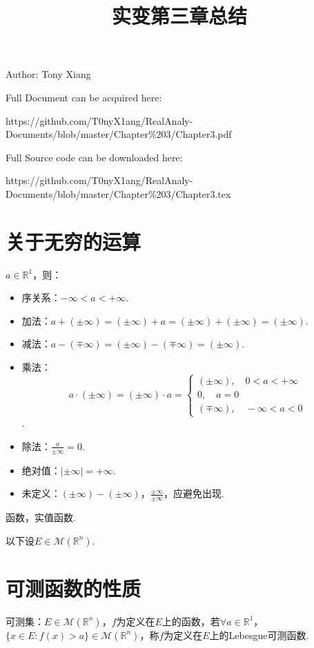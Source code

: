 \documentclass[bwprint, withoutpreface]{cumcmthesis}
\title{实变第三章总结}
\begin{document}
\maketitle
\noindent Author: Tony Xiang

\noindent Full Document can be acquired here: 

\noindent https://github.com/T0nyX1ang/RealAnaly-Documents/blob/master/Chapter\%203/Chapter3.pdf

\noindent Full Source code can be downloaded here:

\noindent https://github.com/T0nyX1ang/RealAnaly-Documents/blob/master/Chapter\%203/Chapter3.tex

\section{关于无穷的运算}
\indent $a \in \mathbb{R}^1$，则：
\begin{itemize}[itemindent=2em]
	\item 序关系：$-\infty < a < +\infty$.
	\item 加法：$a + (\pm{\infty}) = (\pm{\infty}) + a = (\pm{\infty}) + (\pm{\infty}) = (\pm{\infty})$.
	\item 减法：$a - (\mp{\infty}) = (\pm{\infty}) - (\mp{\infty}) = (\pm{\infty})$.
	\item 乘法：
	\begin{equation*}
	a \cdot (\pm{\infty}) = (\pm{\infty}) \cdot a = 
	\begin{cases}
		(\pm{\infty}), \quad 0 < a < +\infty \\
		0, \quad a = 0 \\
		(\mp{\infty}), \quad -\infty < a < 0
	\end{cases} 
	\end{equation*}.
	\item 除法：$\frac{a}{\pm{\infty}} = 0$.
	\item 绝对值：$|\pm{\infty}| = +\infty$.
	\item 未定义：$(\pm{\infty}) - (\pm{\infty})$，$\frac{\pm{\infty}}{\pm{\infty}}$，应避免出现.
\end{itemize}

函数，实值函数.

以下设$E \in \mathcal{M}(\mathbb{R}^n)$.

\section{可测函数的性质}
\indent 可测集：$E \in \mathcal{M}(\mathbb{R}^n)$，$f$为定义在$E$上的函数，若$\forall a \in \mathbb{R}^1$，$\{x \in E: f(x) > a\} \in \mathcal{M}(\mathbb{R}^n)$，称$f$为定义在$E$上的Lebesgue可测函数.
\end{document}
